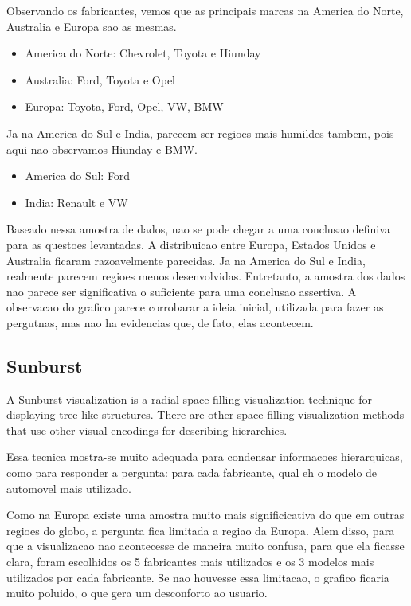 \documentclass[10pt, conference]{IEEEtran}
\begin{document}
Observando os fabricantes, vemos que as principais marcas na America do Norte, Australia e Europa
sao as mesmas.

\begin{itemize}
  \item America do Norte: Chevrolet, Toyota e Hiunday
  \item Australia: Ford, Toyota e Opel
  \item Europa: Toyota, Ford, Opel, VW, BMW
\end{itemize}

Ja na America do Sul e India, parecem ser regioes mais humildes tambem, pois aqui nao observamos
Hiunday e BMW.

\begin{itemize}
  \item America do Sul: Ford
  \item India: Renault e VW
\end{itemize}

Baseado nessa amostra de dados, nao se pode chegar a uma conclusao definiva para as
questoes levantadas. A distribuicao entre Europa, Estados Unidos e Australia ficaram razoavelmente
parecidas. Ja na America do Sul e India, realmente parecem regioes menos desenvolvidas. Entretanto,
a amostra dos dados nao parece ser significativa o suficiente para uma conclusao assertiva. A observacao
do grafico parece corrobarar a ideia inicial, utilizada para fazer as pergutnas, mas nao ha evidencias
que, de fato, elas acontecem.



\subsection{Sunburst}

A Sunburst visualization is a radial space-filling visualization technique for displaying tree like structures. 
There are other space-filling visualization methods that use other visual encodings for describing hierarchies.

Essa tecnica mostra-se muito adequada para condensar informacoes hierarquicas, como para responder a pergunta:
para cada fabricante, qual eh o modelo de automovel mais utilizado. 

Como na Europa existe uma amostra muito mais significicativa do que em outras regioes do globo, a
pergunta fica limitada a regiao da Europa. Alem disso, para que a visualizacao nao acontecesse de maneira
muito confusa, para que ela ficasse clara, foram escolhidos os 5 fabricantes mais utilizados e os 3 modelos
mais utilizados por cada fabricante. Se nao houvesse essa limitacao, o grafico ficaria muito poluido, o que
gera um desconforto ao usuario.
\end{document}
